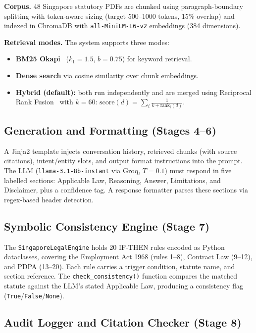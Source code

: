 \documentclass[runningheads]{llncs}
\begin{document}
\textbf{Corpus.} 48 Singapore statutory PDFs are chunked using paragraph-boundary
splitting with token-aware sizing (target 500--1000 tokens, 15\% overlap) and indexed
in ChromaDB with \texttt{all-MiniLM-L6-v2} embeddings (384 dimensions).

\textbf{Retrieval modes.} The system supports three modes:
\begin{itemize}
  \item \textbf{BM25 Okapi}~\cite{b11} ($k_1=1.5$, $b=0.75$) for keyword retrieval.
  \item \textbf{Dense search} via cosine similarity over chunk embeddings.
  \item \textbf{Hybrid (default):} both run independently and are merged using
        Reciprocal Rank Fusion~\cite{b12} with $k=60$:
        $\text{score}(d) = \sum_i \frac{1}{k + \text{rank}_i(d)}$.
\end{itemize}

\subsection{Generation and Formatting (Stages 4--6)}

A Jinja2 template injects conversation history, retrieved chunks (with source
citations), intent/entity slots, and output format instructions into the prompt.
The LLM (\texttt{llama-3.1-8b-instant} via Groq, $T=0.1$) must respond in five
labelled sections: Applicable Law, Reasoning, Answer, Limitations, and Disclaimer,
plus a confidence tag. A response formatter parses these sections via regex-based
header detection.

\subsection{Symbolic Consistency Engine (Stage 7)}

The \texttt{SingaporeLegalEngine} holds 20 IF-THEN rules encoded as Python
dataclasses, covering the Employment Act 1968 (rules 1--8), Contract Law (9--12), and
PDPA (13--20). Each rule carries a trigger condition, statute name, and section
reference. The \texttt{check\_consistency()} function compares the matched statute
against the LLM's stated Applicable Law, producing a consistency flag
(\texttt{True}/\texttt{False}/\texttt{None}).

\subsection{Audit Logger and Citation Checker (Stage 8)}
\end{document}
